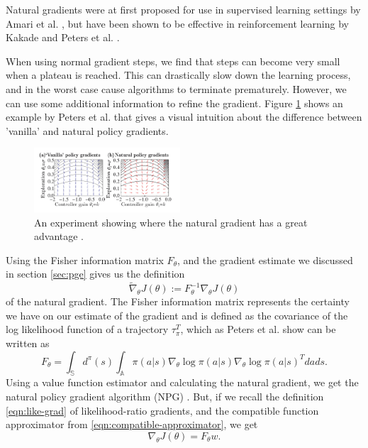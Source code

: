 \documentclass[conference, final]{IEEEtran}
\begin{document}
Natural gradients were at first proposed for use in supervised learning settings by Amari et al. \cite{Amari:1998:NGW:287476.287477}, but have been shown to be effective in reinforcement learning by Kakade \cite{Kakade:2001} and Peters et al. \cite{4863}.

When using normal gradient steps, we find that steps can become very small when a plateau is reached. 
This can drastically slow down the learning process, and in the worst case cause algorithms to terminate prematurely. 
However, we can use some additional information to refine the gradient. 
Figure \ref{fig:nat-grad-adv} shows an example by Peters et al. \cite{Peters_IICHR_2003} that gives a visual intuition about the difference between 'vanilla' and natural policy gradients. 

\begin{figure}
  \includegraphics[width=0.485\textwidth]{nat-grad-adv}
  \caption{An experiment showing where the natural gradient has a great advantage \cite{Peters_IICHR_2003}. }\label{fig:nat-grad-adv}
\end{figure}

Using the Fisher information matrix $F_\theta$, and the gradient estimate we discussed in section \ref{sec:pge} gives us the definition
\begin{equation}
  \widetilde{\nabla}_\theta J(\theta) := F^{-1}_\theta \nabla_\theta J(\theta)
  \label{eqn:nat-grad}
\end{equation}
of the natural gradient. 
The Fisher information matrix represents the certainty we have on our estimate of the gradient and is defined as the covariance of the log likelihood function of a trajectory $\tau_{\pi}^T$, which as Peters et al. \cite{4863} show can be written as 
\begin{equation}
  F_\theta = \int_\mathbb{S} d^\pi(s) \int_\mathbb{A} \pi(a|s) \nabla_\theta \log{\pi(a|s)} \nabla_\theta \log{\pi(a|s)}^T dads.
  \label{eqn:F}
\end{equation}
Using a value function estimator and calculating the natural gradient, we get the natural policy gradient algorithm (NPG) \cite{NIPS2017_7233}.
But, if we recall the definition \eqref{eqn:like-grad} of likelihood-ratio gradients, and the compatible function approximator from \eqref{eqn:compatible-approximator}, we get
\begin{equation}
  \nabla_\theta J(\theta) = F_\theta w.
  \label{eqn:J-equals-F}
\end{equation}
\end{document}
